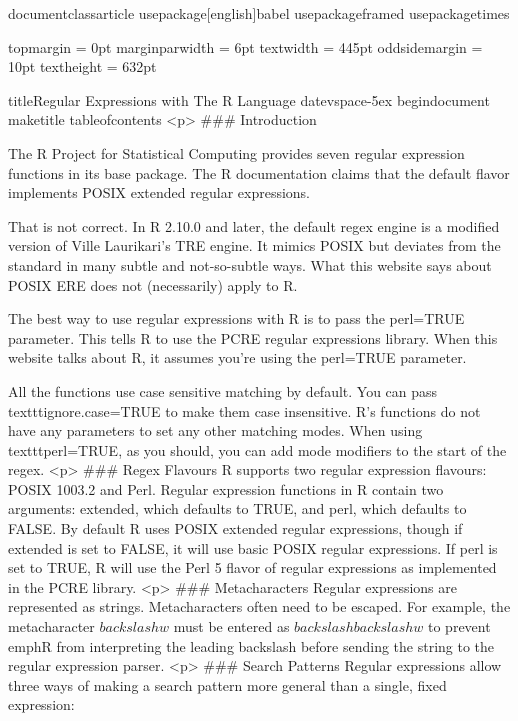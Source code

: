 documentclass{article}
usepackage[english]{babel}
usepackage{framed}
usepackage{times}

topmargin = 0pt
marginparwidth = 6pt
textwidth = 445pt
oddsidemargin = 10pt
textheight = 632pt

title{Regular Expressions with The R Language}
date{vspace{-5ex}}
begin{document}
maketitle
tableofcontents
<p>
### {Introduction}


The R Project for Statistical Computing provides seven regular expression functions in its base package. The R documentation claims that the default flavor implements POSIX extended regular expressions. 

That is not correct. In R 2.10.0 and later, the default regex engine is a modified version of Ville Laurikari's TRE engine. It mimics POSIX but deviates from the standard in many subtle and not-so-subtle ways. What this website says about POSIX ERE does not (necessarily) apply to R.


The best way to use regular expressions with R is to pass the perl=TRUE parameter. This tells R to use the PCRE regular expressions library. When this website talks about R, it assumes you're using the perl=TRUE parameter.

All the functions use case sensitive matching by default. You can pass texttt{ignore.case=TRUE} to make them case insensitive. R's functions do not have any parameters to set any other matching modes. When using texttt{perl=TRUE}, as you should, you can add mode modifiers to the start of the regex.
<p>
### {Regex Flavours}
R supports two regular expression flavours: POSIX 1003.2 and Perl. Regular expression functions in R contain two arguments: extended, which defaults to TRUE, and perl, which defaults to FALSE. By default R uses POSIX extended regular expressions, though if extended is set to FALSE, it will use basic POSIX regular expressions. If perl is set to TRUE, R will use the Perl 5 flavor of regular expressions as implemented in the PCRE library.
<p>
### {Metacharacters}
Regular expressions are represented as strings. Metacharacters often need to be escaped. For example, the metacharacter $backslash w$ must be entered as $backslashbackslash w$ to prevent emph{R} from interpreting the leading backslash before sending the string to the regular expression parser.
<p>
### {Search Patterns}
Regular expressions allow three ways of making a search pattern more general than a single, fixed expression:

